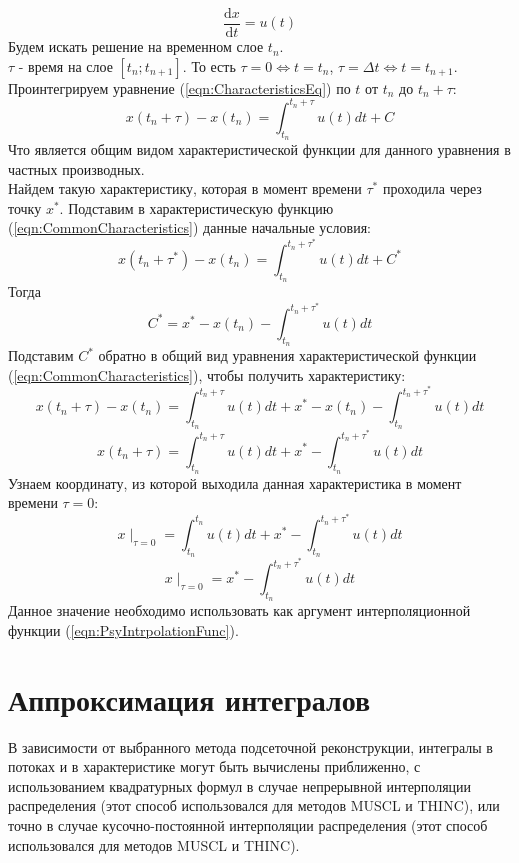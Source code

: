 \documentclass[10pt,a4paper]{article}
\begin{document}
\begin{equation}
\label{eqn:CharacteristicsEq}
\frac{\text{d}x}{\text{d}t}=u(t)
\end{equation}
Будем искать решение на временном слое $t_n$.
\\$\tau$ - время на слое $[t_n; t_{n+1}]$. То есть $\tau=0 \Leftrightarrow t=t_n$, $\tau=\Delta t \Leftrightarrow t=t_{n+1}$.
\\Проинтегрируем уравнение (\ref{eqn:CharacteristicsEq}) по $t$ от $t_n$ до $t_n+\tau$:
\begin{equation}
\label{eqn:CommonCharacteristics}
x(t_n+\tau)-x(t_n)=\int_{t_n}^{t_n+\tau}u(t)dt + C
\end{equation}
Что является общим видом характеристической функции для данного уравнения в частных производных.
\\Найдем такую характеристику, которая в момент времени $\tau^*$ проходила через точку $x^*$. Подставим в характеристическую функцию (\ref{eqn:CommonCharacteristics}) данные начальные условия:
\[
x(t_n+\tau^*)-x(t_n)=\int_{t_n}^{t_n+\tau^*}u(t)dt + C^*
\]
Тогда
\[
C^* = x^*-x(t_n)-\int_{t_n}^{t_n+\tau^*}u(t)dt
\]
Подставим $C^*$ обратно в общий вид уравнения характеристической функции (\ref{eqn:CommonCharacteristics}), чтобы получить характеристику:
\[
x(t_n+\tau)-x(t_n)=\int_{t_n}^{t_n+\tau}u(t)dt + x^*-x(t_n)-\int_{t_n}^{t_n+\tau^*}u(t)dt
\]
\begin{equation}
\label{eqn:Characteristic}
x(t_n+\tau)=\int_{t_n}^{t_n+\tau}u(t)dt + x^*-\int_{t_n}^{t_n+\tau^*}u(t)dt
\end{equation}
Узнаем координату, из которой выходила данная характеристика в момент времени $\tau=0$:
\[
x\mid_{\tau=0}=\int_{t_n}^{t_n}u(t)dt + x^*-\int_{t_n}^{t_n+\tau^*}u(t)dt
\]
\begin{equation}
\label{eqn:CharacteristicFromZero}
x\mid_{\tau=0}=x^*-\int_{t_n}^{t_n+\tau^*}u(t)dt
\end{equation}
Данное значение необходимо использовать как аргумент интерполяционной функции (\ref{eqn:PsyIntrpolationFunc}).

\section{Аппроксимация интегралов}
В зависимости от выбранного метода подсеточной реконструкции, интегралы в потоках и в характеристике могут быть вычислены приближенно, с использованием квадратурных формул в случае непрерывной интерполяции распределения (этот способ использовался для методов MUSCL и THINC), или точно в случае кусочно-постоянной интерполяции распределения (этот способ использовался для методов MUSCL и THINC).
\end{document}
